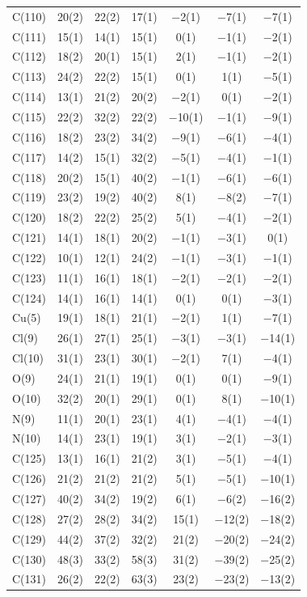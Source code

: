 \begin{center}
{\begin{supertabular}{lcccccc}
C(110)&20(2) &22(2)&17(1) &$-$2(1)&$-$7(1) &$-$7(1)\\
C(111)&15(1) &14(1)&15(1) &0(1)&$-$1(1) &$-$2(1)\\
C(112)&18(2) &20(1)&15(1) &2(1)&$-$1(1) &$-$2(1)\\
C(113)&24(2) &22(2)&15(1) &0(1)&1(1) &$-$5(1)\\
C(114)&13(1) &21(2)&20(2) &$-$2(1)&0(1) &$-$2(1)\\
C(115)&22(2) &32(2)&22(2) &$-$10(1)&$-$1(1) &$-$9(1)\\
C(116)&18(2) &23(2)&34(2) &$-$9(1)&$-$6(1) &$-$4(1)\\
C(117)&14(2) &15(1)&32(2) &$-$5(1)&$-$4(1) &$-$1(1)\\
C(118)&20(2) &15(1)&40(2) &$-$1(1)&$-$6(1) &$-$6(1)\\
C(119)&23(2) &19(2)&40(2) &8(1)&$-$8(2) &$-$7(1)\\
C(120)&18(2) &22(2)&25(2) &5(1)&$-$4(1) &$-$2(1)\\
C(121)&14(1) &18(1)&20(2) &$-$1(1)&$-$3(1) &0(1)\\
C(122)&10(1) &12(1)&24(2) &$-$1(1)&$-$3(1) &$-$1(1)\\
C(123)&11(1) &16(1)&18(1) &$-$2(1)&$-$2(1) &$-$2(1)\\
C(124)&14(1) &16(1)&14(1) &0(1)&0(1) &$-$3(1)\\
Cu(5)&19(1) &18(1)&21(1) &$-$2(1)&1(1) &$-$7(1)\\
Cl(9)&26(1) &27(1)&25(1) &$-$3(1)&$-$3(1) &$-$14(1)\\
Cl(10)&31(1) &23(1)&30(1) &$-$2(1)&7(1) &$-$4(1)\\
O(9)&24(1) &21(1)&19(1) &0(1)&0(1) &$-$9(1)\\
O(10)&32(2) &20(1)&29(1) &0(1)&8(1) &$-$10(1)\\
N(9)&11(1) &20(1)&23(1) &4(1)&$-$4(1) &$-$4(1)\\
N(10)&14(1) &23(1)&19(1) &3(1)&$-$2(1) &$-$3(1)\\
C(125)&13(1) &16(1)&21(2) &3(1)&$-$5(1) &$-$4(1)\\
C(126)&21(2) &21(2)&21(2) &5(1)&$-$5(1) &$-$10(1)\\
C(127)&40(2) &34(2)&19(2) &6(1)&$-$6(2) &$-$16(2)\\
C(128)&27(2) &28(2)&34(2) &15(1)&$-$12(2) &$-$18(2)\\
C(129)&44(2) &37(2)&32(2) &21(2)&$-$20(2) &$-$24(2)\\
C(130)&48(3) &33(2)&58(3) &31(2)&$-$39(2) &$-$25(2)\\
C(131)&26(2) &22(2)&63(3) &23(2)&$-$23(2) &$-$13(2)\\

\end{supertabular}}
\end{center}
